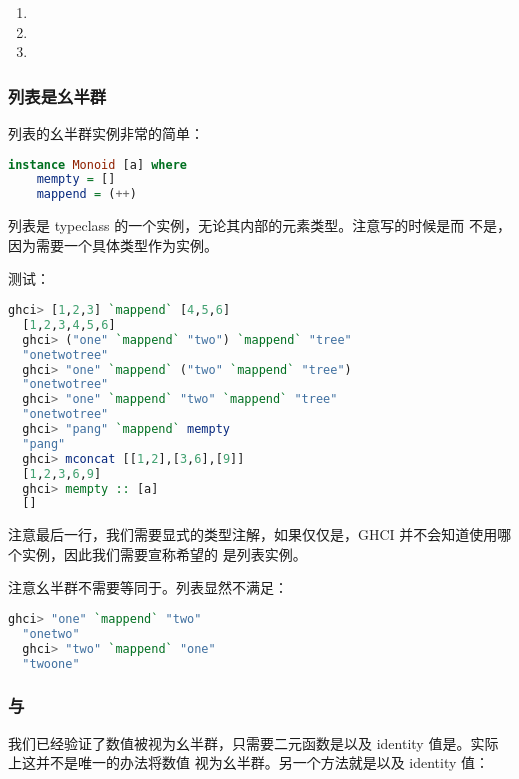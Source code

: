 \documentclass[./main.tex]{subfiles}
\begin{document}
\begin{enumerate}
  \item {}
  \item {}
  \item {}
\end{enumerate}

\subsubsection*{列表是幺半群}

列表的幺半群实例非常的简单：

\begin{lstlisting}[language=Haskell]
  instance Monoid [a] where
    mempty = []
    mappend = (++)
\end{lstlisting}

列表是 typeclass 的一个实例，无论其内部的元素类型。注意写的时候是而
不是，因为需要一个具体类型作为实例。

测试：

\begin{lstlisting}[language=Haskell]
  ghci> [1,2,3] `mappend` [4,5,6]
  [1,2,3,4,5,6]
  ghci> ("one" `mappend` "two") `mappend` "tree"
  "onetwotree"
  ghci> "one" `mappend` ("two" `mappend` "tree")
  "onetwotree"
  ghci> "one" `mappend` "two" `mappend` "tree"
  "onetwotree"
  ghci> "pang" `mappend` mempty
  "pang"
  ghci> mconcat [[1,2],[3,6],[9]]
  [1,2,3,6,9]
  ghci> mempty :: [a]
  []
\end{lstlisting}

注意最后一行，我们需要显式的类型注解，如果仅仅是，GHCI 并不会知道使用哪个实例，因此我们需要宣称希望的
是列表实例。

注意幺半群不需要等同于。列表显然不满足：

\begin{lstlisting}[language=Haskell]
  ghci> "one" `mappend` "two"
  "onetwo"
  ghci> "two" `mappend` "one"
  "twoone"
\end{lstlisting}

\subsubsection*{与}

我们已经验证了数值被视为幺半群，只需要二元函数是\acode{*}以及 identity 值是。实际上这并不是唯一的办法将数值
视为幺半群。另一个方法就是\acode{+}以及 identity 值：
\end{document}
